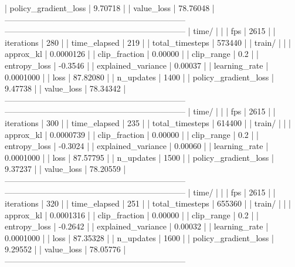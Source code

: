 |    policy_gradient_loss |      9.70718 |
|    value_loss           |     78.76048 |
------------------------------------------------------------------
------------------------------------------------------------------
| time/                   |              |
|    fps                  |         2615 |
|    iterations           |          280 |
|    time_elapsed         |          219 |
|    total_timesteps      |       573440 |
| train/                  |              |
|    approx_kl            |    0.0000126 |
|    clip_fraction        |      0.00000 |
|    clip_range           |          0.2 |
|    entropy_loss         |      -0.3546 |
|    explained_variance   |      0.00037 |
|    learning_rate        |    0.0001000 |
|    loss                 |     87.82080 |
|    n_updates            |         1400 |
|    policy_gradient_loss |      9.47738 |
|    value_loss           |     78.34342 |
------------------------------------------------------------------
------------------------------------------------------------------
| time/                   |              |
|    fps                  |         2615 |
|    iterations           |          300 |
|    time_elapsed         |          235 |
|    total_timesteps      |       614400 |
| train/                  |              |
|    approx_kl            |    0.0000739 |
|    clip_fraction        |      0.00000 |
|    clip_range           |          0.2 |
|    entropy_loss         |      -0.3024 |
|    explained_variance   |      0.00060 |
|    learning_rate        |    0.0001000 |
|    loss                 |     87.57795 |
|    n_updates            |         1500 |
|    policy_gradient_loss |      9.37237 |
|    value_loss           |     78.20559 |
------------------------------------------------------------------
------------------------------------------------------------------
| time/                   |              |
|    fps                  |         2615 |
|    iterations           |          320 |
|    time_elapsed         |          251 |
|    total_timesteps      |       655360 |
| train/                  |              |
|    approx_kl            |    0.0001316 |
|    clip_fraction        |      0.00000 |
|    clip_range           |          0.2 |
|    entropy_loss         |      -0.2642 |
|    explained_variance   |      0.00032 |
|    learning_rate        |    0.0001000 |
|    loss                 |     87.35328 |
|    n_updates            |         1600 |
|    policy_gradient_loss |      9.29552 |
|    value_loss           |     78.05776 |
------------------------------------------------------------------
